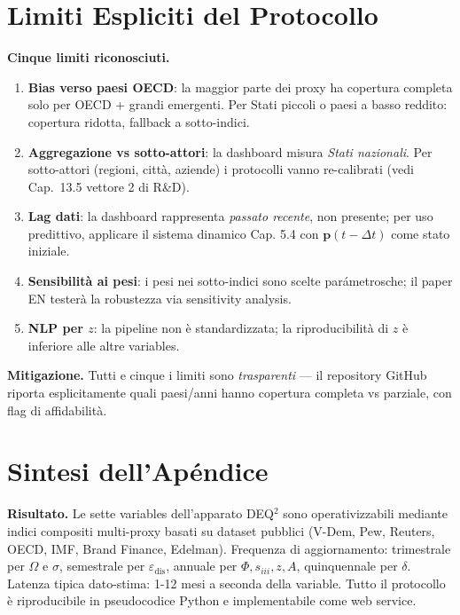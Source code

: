 \section{Limiti Espliciti del
Protocollo}\label{limiti-espliciti-del-protocollo}

\Conj{} \textbf{Cinque limiti riconosciuti.}

\begin{enumerate}
\def\labelenumi{\arabic{enumi}.}
\tightlist
\item
  \textbf{Bias verso paesi OECD}: la maggior parte dei proxy ha
  copertura completa solo per OECD + grandi emergenti. Per Stati piccoli
  o paesi a basso reddito: copertura ridotta, fallback a sotto-indici.
\item
  \textbf{Aggregazione vs sotto-attori}: la dashboard misura \emph{Stati
  nazionali}. Per sotto-attori (regioni, città, aziende) i protocolli
  vanno re-calibrati (vedi Cap.~13.5 vettore 2 di R\&D).
\item
  \textbf{Lag dati}: la dashboard rappresenta \emph{passato recente},
  non presente; per uso predittivo, applicare il sistema dinamico Cap.
  5.4 con \(\boldsymbol{p}(t-\Delta t)\) come stato iniziale.
\item
  \textbf{Sensibilità ai pesi}: i pesi nei sotto-indici sono scelte
  parámetrosche; il paper EN testerà la robustezza via sensitivity
  analysis.
\item
  \textbf{NLP per \(z\)}: la pipeline non è standardizzata; la
  riproducibilità di \(z\) è inferiore alle altre variables.
\end{enumerate}

\Proved{} \textbf{Mitigazione.} Tutti e cinque i limiti sono
\emph{trasparenti} --- il repository GitHub riporta esplicitamente quali
paesi/anni hanno copertura completa vs parziale, con flag di
affidabilità.



\section{Sintesi dell'Apéndice}\label{sintesi-dellapéndice}

\Proved{} \textbf{Risultato.} Le sette variables dell'apparato DEQ$^2$ sono
operativizzabili mediante indici compositi multi-proxy basati su dataset
pubblici (V-Dem, Pew, Reuters, OECD, IMF, Brand Finance, Edelman).
Frequenza di aggiornamento: trimestrale per \(\Omega\) e \(\sigma\),
semestrale per \(\varepsilon_{\text{dis}}\), annuale per
\(\Phi, s_{iii}, z, A\), quinquennale per \(\delta\). Latenza tipica
dato-stima: 1-12 mesi a seconda della variable. Tutto il protocollo è
riproducibile in pseudocodice Python e implementabile come web service.

